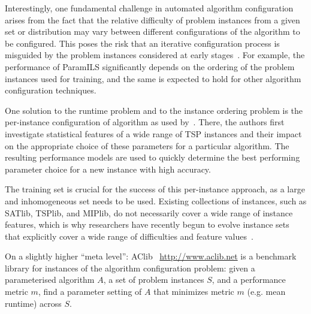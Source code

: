 \documentclass{article}
\begin{document}
Interestingly, one fundamental challenge in automated algorithm configuration arises from the fact that the relative difficulty of problem instances from a given set or distribution may vary between different configurations of the algorithm to be configured. This poses the risk that an iterative configuration process is misguided by the problem instances considered at early stages~\cite{Schneider2012homogeneity}. For example, the performance of ParamILS significantly depends on the ordering of the problem instances used for training, and the same is expected to hold for other algorithm configuration techniques. 

One solution to the runtime problem and to the instance ordering problem is the per-instance configuration of algorithm as used by~\citet{Nallaperuma2015antsTsp}. 
There, the authors first investigate statistical features of a wide range of TSP instances and their impact on the appropriate choice of these parameters for a particular algorithm. 
The resulting performance models are used to quickly determine the best performing parameter choice for a new instance with high accuracy.

The training set is crucial for the success of this per-instance approach, as a large and inhomogeneous set needs to be used. Existing collections of instances, such as SATlib, TSPlib, and MIPlib, do not necessarily cover a wide range of instance features, which is why researchers have recently begun to evolve instance sets that explicitly cover a wide range of difficulties and feature values~\cite{SmithMiles2010tspfirst,Mersmann2012twoopt,Nallaperuma2013christofides,SmithMiles2015evolvingInstanceSpace}.  



On a slightly higher ``meta level'': AClib~\cite{DBLP:conf/lion/HutterLFLHLS14} \url{http://www.aclib.net} is a benchmark library for instances of the algorithm configuration problem: given a parameterised algorithm $A$, a set of problem instances $S$, and a performance metric $m$, find a parameter setting of $A$ that minimizes metric $m$ (e.g. mean runtime) across $S$. 
\end{document}
